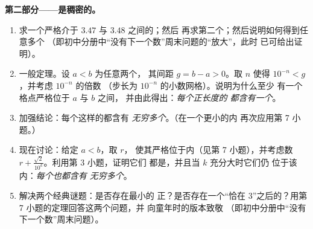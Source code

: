 \begin{problem}
\medskip
\noindent\textbf{第二部分——是稠密的。}
\begin{enumerate}[resume]
  \item 求一个严格介于 $3.47$ 与 $3.48$ 之间的；然后
        再求第二个；然后说明如何得到任意多个
        （即初中分册中“没有下一个数”周末问题的“放大”，此时
        已可给出证明）。
  \item 一般定理。设 $a < b$ 为任意两个，
        其间距 $g = b - a > 0$。取 $n$ 使得
        $10^{-n} < g$，并考虑 $10^{-n}$ 的倍数
        （步长为 $10^{-n}$ 的小数网格）。说明为什么至少
        有一个格点严格位于 $a$ 与 $b$ 之间，
        并由此得出：\emph{每个正长度的
        都含有一个}。
  \item 加强结论：每个这样的都含有
        \emph{无穷多个}。（在一个更小的内
        再次应用第 7 小题。）
  \item 现在讨论：给定 $a < b$，取 $r$，
        使其严格位于内（见第 7 小题），并考虑数
        $r + \frac{\sqrt2}{10^k}$。利用第 3 小题，证明它们
        都是，并且当 $k$ 充分大时它们仍
        位于该内：\emph{每个也都含有
        无穷多个}。
  \item 解决两个经典谜题：是否存在最小的
        正？是否存在一个“恰在
        $3$”之后的？用第 7 小题的定理回答这两个问题，并
        向童年时的版本致敬
        （即初中分册中“没有下一个数”周末问题）。
\end{enumerate}


\end{problem}
